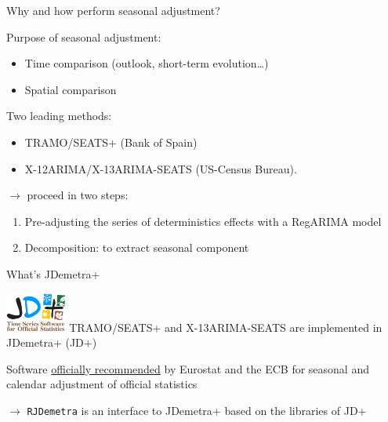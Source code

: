 \documentclass[10pt,xcolor=table,color={dvipsnames,usenames},ignorenonframetext,usepdftitle=false,french]{beamer}
\providecommand{\tightlist}{%
  \setlength{\parskip}{0pt}
  }
\begin{document}
\begin{frame}{Why and how perform seasonal adjustment?}
\protect\hypertarget{why-and-how-perform-seasonal-adjustment}{}

Purpose of seasonal adjustment:

\begin{itemize}
\tightlist
\item
  Time comparison (outlook, short-term evolution\ldots{})\\
\item
  Spatial comparison
\end{itemize}

\bigskip
\pause

Two leading methods:

\begin{itemize}
\tightlist
\item
  TRAMO/SEATS+ (Bank of Spain)\\
\item
  X-12ARIMA/X-13ARIMA-SEATS (US-Census Bureau).
\end{itemize}

\bigskip
\pause

\(\rightarrow\) proceed in two steps:

\begin{enumerate}
\item
  Pre-adjusting the series of deterministics effects with a RegARIMA
  model
\item
  Decomposition: to extract seasonal component
\end{enumerate}

\end{frame}

\begin{frame}{What's JDemetra+\bcquestion }
\protect\hypertarget{whats-jdemetra}{}

\includegraphics[width=2cm]{img/jdemetra+.png} TRAMO/SEATS+ and
X-13ARIMA-SEATS are implemented in JDemetra+ (JD+)

\bigskip

\large\faThumbsUp{} \normalsize Software
\href{https://ec.europa.eu/eurostat/cros/system/files/Jdemetra_\%20release.pdf}{officially
recommended} by Eurostat and the ECB for seasonal and calendar
adjustment of official statistics

\bigskip

\(\rightarrow\) \texttt{RJDemetra} is an \large\faRProject{}
\normalsize interface to JDemetra+ based on the \large\faJava{}
\normalsize libraries of JD+

\end{frame}
\end{document}
